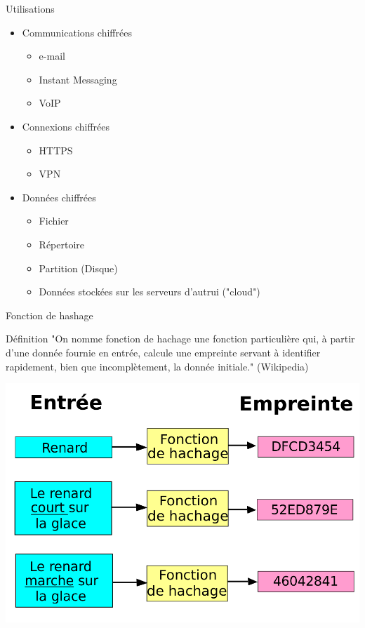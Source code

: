 \documentclass[12pt]{beamer}
\begin{document}
		\begin{frame}{Utilisations}
			\begin{itemize}
				\item Communications chiffrées
					\begin{itemize}
						\item e-mail
						\item Instant Messaging
						\item VoIP
					\end{itemize}
				\item Connexions chiffrées
					\begin{itemize}
						\item HTTPS
						\item VPN
					\end{itemize}	
				\item Données chiffrées
					\begin{itemize}
						\item Fichier
						\item Répertoire
						\item Partition (Disque)
						\item Données stockées sur les serveurs d'autrui ("cloud")
					\end{itemize}
			\end{itemize}
		\end{frame}
		
		\begin{frame}{Fonction de hashage}
			\onslide<1->
			\begin{exampleblock}{Définition}
				 "On nomme \alert{fonction de hachage} une fonction particulière qui, à partir d'une donnée fournie en entrée, 
				calcule une empreinte servant à identifier rapidement, bien que incomplètement, la donnée initiale." (Wikipedia)
			\end{exampleblock}
			\begin{center}
				\includegraphics[scale=.21]{Hash_function_fr.png}
			\end{center}
		\end{frame}
		
\end{document}
